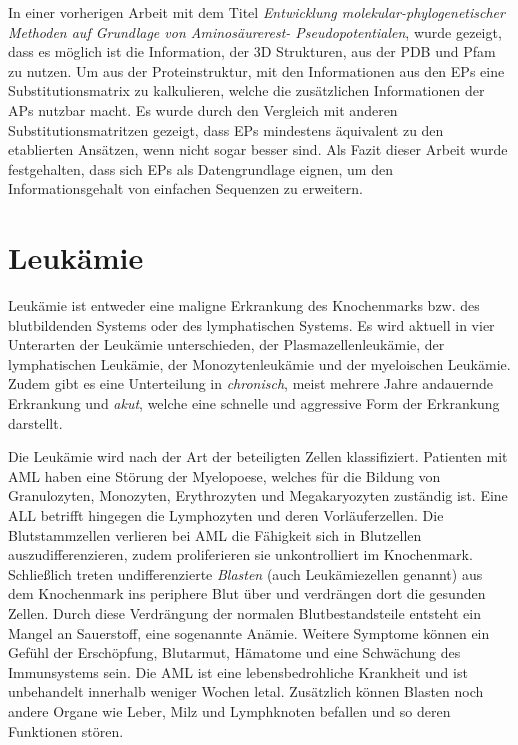 In einer vorherigen Arbeit mit dem Titel \emph{Entwicklung mole\-kular-phylo\-genetisch\-er Methoden auf Grundlage von Aminosäurerest- Pseudopotentialen}, wurde gezeigt, dass es möglich ist die Information, der 3D Strukturen, aus der \ac{PDB} und \ac{Pfam} zu nutzen\cite{Mathias.2014}. Um aus der Proteinstruktur, mit den Informationen aus den EPs eine Substitutionsmatrix zu kalkulieren, welche die zusätzlichen Informationen der \ac{APs} nutzbar macht. Es wurde durch den Vergleich mit anderen Substitutionsmatritzen gezeigt, dass \ac{EP}s mindestens äquivalent zu den etablierten Ansätzen, wenn nicht sogar besser sind. Als Fazit dieser Arbeit wurde festgehalten, dass sich \ac{EP}s als Datengrundlage eignen, um den Informationsgehalt von einfachen Sequenzen zu erweitern.


\section{Leukämie}
Leukämie ist entweder eine maligne Erkrankung des Knochenmarks bzw. des blutbildenden Systems oder des lymphatischen Systems. Es wird aktuell in vier Unterarten der Leukämie unterschieden, der Plasmazellenleukämie, der lymphatischen Leukämie, der Monozytenleukämie und der myeloischen Leukämie. Zudem gibt es eine Unterteilung in \emph{chronisch}, meist mehrere Jahre andauernde Erkrankung und \emph{akut}, welche eine schnelle und aggressive Form der Erkrankung darstellt.

Die Leukämie wird nach der Art der beteiligten Zellen klassifiziert. Patienten mit \ac{AML} haben eine Störung der Myelopoese, welches für die Bildung von Granulozyten, Monozyten, Erythrozyten und Megakaryozyten zuständig ist. Eine \ac{ALL} betrifft hingegen die Lymphozyten und deren Vorläuferzellen. Die Blutstammzellen verlieren bei \ac{AML} die Fähigkeit sich in Blutzellen auszudifferenzieren, zudem proliferieren sie unkontrolliert im Knochenmark\cite{Papaemmanuil.2016}. Schließlich treten undifferenzierte \emph{Blasten} (auch Leukämiezellen genannt) aus dem Knochenmark ins periphere Blut über und verdrängen dort die gesunden Zellen. Durch diese Verdrängung der normalen Blutbestandsteile entsteht ein Mangel an Sauerstoff, eine sogenannte Anämie. Weitere Symptome können ein Gefühl der Erschöpfung, Blutarmut, Hämatome und eine Schwächung des Immunsystems sein. Die \ac{AML} ist eine lebensbedrohliche Krankheit und ist unbehandelt innerhalb weniger Wochen letal. Zusätzlich können Blasten noch andere Organe wie Leber, Milz und Lymphknoten befallen und so deren Funktionen stören.

